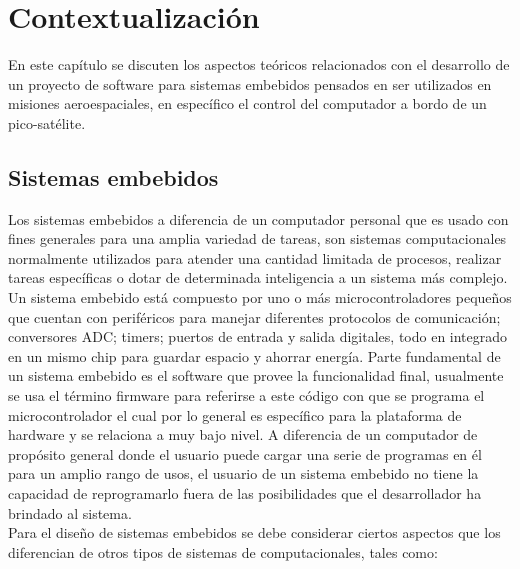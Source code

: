 \documentclass[11pt,letterpaper]{article}
\begin{document}
\section{Contextualización}

En este capítulo se discuten los aspectos teóricos relacionados con el desarrollo de un proyecto de software para sistemas embebidos pensados en ser utilizados en misiones aeroespaciales, en específico el control del computador a bordo de un pico-satélite.

\subsection{Sistemas embebidos}

Los sistemas embebidos a diferencia de un computador personal que es usado con fines generales para una amplia variedad de tareas, son sistemas computacionales normalmente utilizados para atender una cantidad limitada de procesos, realizar tareas específicas o dotar de determinada inteligencia a un sistema más complejo. Un sistema embebido está compuesto por uno o más microcontroladores pequeños que cuentan con periféricos para manejar diferentes protocolos de comunicación; conversores ADC; timers; puertos de entrada y salida digitales, todo en integrado en un mismo chip para guardar espacio y ahorrar energía. Parte fundamental de un sistema embebido es el software que provee la funcionalidad final, usualmente se usa el término firmware para referirse a este código con que se programa el microcontrolador el cual por lo general es específico para la plataforma de hardware y se relaciona a muy bajo nivel. A diferencia de un computador de propósito general donde el usuario puede cargar una serie de programas en él para un amplio rango de usos, el usuario de un sistema embebido no tiene la capacidad de reprogramarlo fuera de las posibilidades que el desarrollador ha brindado al sistema\cite{EMBEDDED}.\\

Para el diseño de sistemas embebidos se debe considerar ciertos aspectos que los diferencian de otros tipos de sistemas de computacionales, tales como\cite{SE}:
\end{document}
